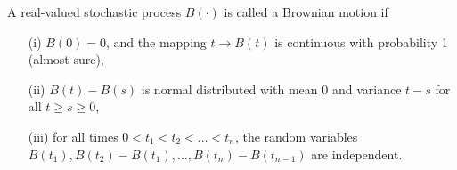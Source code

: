 \begin{definition} \label{Definition_BM}
A real-valued stochastic process $B(\cdot)$ is called a Brownian motion if
\begin{enumerate}
\item[(i)] $B(0)=0$, and the mapping $t\to B(t)$ is continuous with probability 1 (almost sure),
\item[(ii)] $B(t)-B(s)$ is normal distributed with mean $0$ and variance $t-s$ for all $t\geq s\geq0$,
\item[(iii)] for all times $0<t_1<t_2<\dots<t_n$, the random variables $B(t_1),B(t_2)-B(t_1),\dots,B(t_n)-B(t_{n-1})$ are independent.
\end{enumerate}
\end{definition}

%
%


